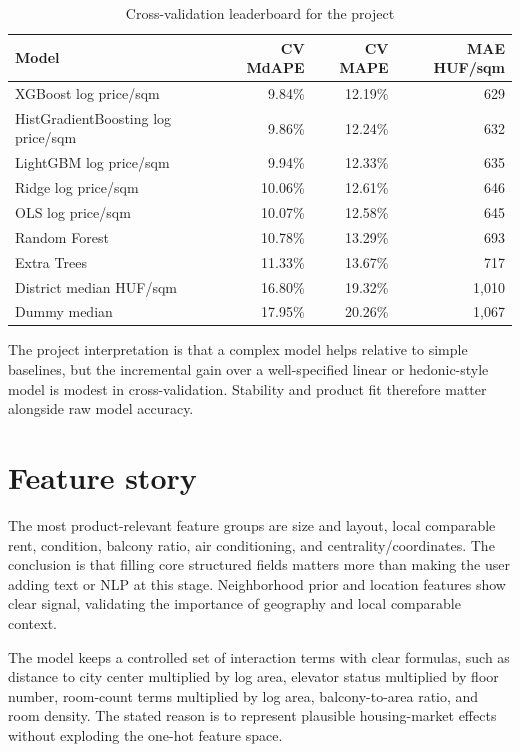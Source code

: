 \documentclass[12pt,a4paper]{article}
\begin{document}
\begin{table}[h]
\centering
\caption{Cross-validation leaderboard for the project}
\begin{tabular}{@{}lrrr@{}}
\toprule
Model & CV MdAPE & CV MAPE & MAE HUF/sqm \\
\midrule
XGBoost log price/sqm & 9.84\% & 12.19\% & 629 \\
HistGradientBoosting log price/sqm & 9.86\% & 12.24\% & 632 \\
LightGBM log price/sqm & 9.94\% & 12.33\% & 635 \\
Ridge log price/sqm & 10.06\% & 12.61\% & 646 \\
OLS log price/sqm & 10.07\% & 12.58\% & 645 \\
Random Forest & 10.78\% & 13.29\% & 693 \\
Extra Trees & 11.33\% & 13.67\% & 717 \\
District median HUF/sqm & 16.80\% & 19.32\% & 1,010 \\
Dummy median & 17.95\% & 20.26\% & 1,067 \\
\bottomrule
\end{tabular}
\end{table}

The project interpretation is that a complex model helps relative to simple baselines, but the incremental gain over a well-specified linear or hedonic-style model is modest in cross-validation. Stability and product fit therefore matter alongside raw model accuracy.

\section{Feature story}

The most product-relevant feature groups are size and layout, local comparable rent, condition, balcony ratio, air conditioning, and centrality/coordinates. The conclusion is that filling core structured fields matters more than making the user adding text or NLP at this stage. Neighborhood prior and location features show clear signal, validating the importance of geography and local comparable context.

The model keeps a controlled set of interaction terms with clear formulas, such as distance to city center multiplied by log area, elevator status multiplied by floor number, room-count terms multiplied by log area, balcony-to-area ratio, and room density. The stated reason is to represent plausible housing-market effects without exploding the one-hot feature space.
\end{document}
